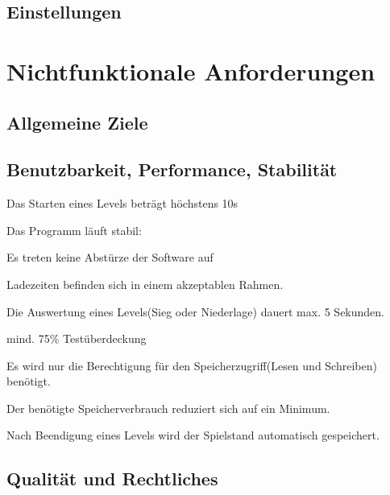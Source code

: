 \documentclass{scrartcl}
\begin{document}
\subsection{Einstellungen}

\clearpage









\section{Nichtfunktionale Anforderungen}

\subsection{Allgemeine Ziele}

\begin{nflist}
    \item
\end{nflist}

\subsection{Benutzbarkeit, Performance, Stabilität}
\begin{nflist}[resume]
	\item Das Starten eines Levels beträgt höchstens 10s 
	\item Das Programm läuft stabil: 
	\begin{nflist}
		\item Es treten keine Abstürze der Software auf 
		\item Ladezeiten befinden sich in einem akzeptablen Rahmen. 
	\end{nflist}
	\item Die Auswertung eines Levels(Sieg oder Niederlage) dauert max. 5 Sekunden. 
	\item mind. 75\% Testüberdeckung 
	\item Es wird nur die Berechtigung für den Speicherzugriff(Lesen
	und Schreiben) benötigt. 
	\item Der benötigte Speicherverbrauch reduziert sich auf ein Minimum. 
	\item Nach Beendigung eines Levels wird der Spielstand automatisch gespeichert.
\end{nflist}

\subsection{Qualität und Rechtliches}
\end{document}
